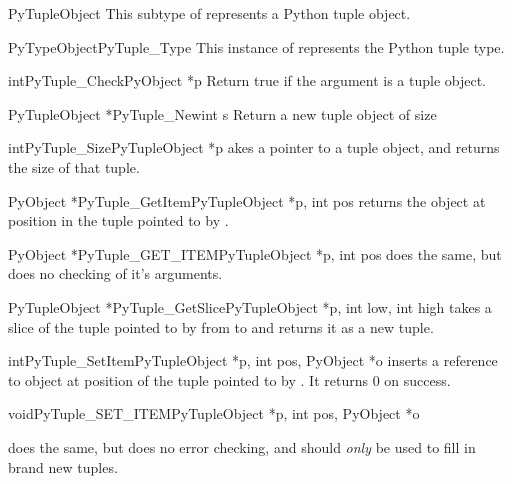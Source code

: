 \documentclass[twoside,openright]{report}
\begin{document}
\begin{ctypedesc}{PyTupleObject}
This subtype of  represents a Python tuple object.
\end{ctypedesc}

\begin{cvardesc}{PyTypeObject}{PyTuple_Type}
This instance of  represents the Python tuple type.
\end{cvardesc}

\begin{cfuncdesc}{int}{PyTuple_Check}{PyObject *p}
Return true if the argument is a tuple object.
\end{cfuncdesc}

\begin{cfuncdesc}{PyTupleObject *}{PyTuple_New}{int s}
Return a new tuple object of size 
\end{cfuncdesc}

\begin{cfuncdesc}{int}{PyTuple_Size}{PyTupleObject *p}
akes a pointer to a tuple object, and returns the size
of that tuple.
\end{cfuncdesc}

\begin{cfuncdesc}{PyObject *}{PyTuple_GetItem}{PyTupleObject *p, int pos}
returns the object at position  in the tuple pointed
to by .
\end{cfuncdesc}

\begin{cfuncdesc}{PyObject *}{PyTuple_GET_ITEM}{PyTupleObject *p, int pos}
does the same, but does no checking of it's
arguments.
\end{cfuncdesc}

\begin{cfuncdesc}{PyTupleObject *}{PyTuple_GetSlice}{PyTupleObject *p,
            int low,
            int high}
takes a slice of the tuple pointed to by  from
 to  and returns it as a new tuple.
\end{cfuncdesc}

\begin{cfuncdesc}{int}{PyTuple_SetItem}{PyTupleObject *p,
            int pos,
            PyObject *o}
inserts a reference to object  at position  of
the tuple pointed to by . It returns 0 on success.
\end{cfuncdesc}

\begin{cfuncdesc}{void}{PyTuple_SET_ITEM}{PyTupleObject *p,
            int pos,
            PyObject *o}

does the same, but does no error checking, and
should \emph{only} be used to fill in brand new tuples.
\end{cfuncdesc}
\end{document}
